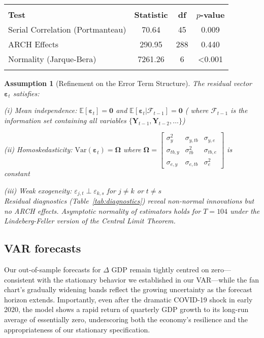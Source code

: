 \documentclass[
]{article}
\let\oldtable\table
\let\endoldtable\endtable
\renewenvironment{table}[1][H]{\oldtable[H]}{\endoldtable}
\newtheorem{assumption}{Assumption} %
\begin{document}
\begin{table}[!htbp]
\centering
\caption{\textsc{Residual Diagnostic Tests}}
\label{tab:diagnostics}
\small
\begin{tabular}{@{}lSSS@{}}
\\  \hline \hline \\
\textbf{Test} & \textbf{Statistic} & \textbf{df} & \textbf{$p$-value} \\ 
\midrule
Serial Correlation (Portmanteau) & 70.64 & 45 & 0.009 \\
ARCH Effects & 290.95 & 288 & 0.440 \\
Normality (Jarque-Bera) & 7261.26 & 6 & <0.001 \\
 \hline \hline  \\
\end{tabular}
\end{table}

\begin{assumption}[Refinement on the Error Term Structure]\label{assump:errors}
The residual vector $\bm{\varepsilon}_t$ satisfies: 

(i) Mean independence: $\mathbb{E}[\bm{\varepsilon}_t] = 
\bm{0}$ and $\mathbb{E}[\bm{\varepsilon}_t|\mathcal{F}_{t-1}] = \bm{0}$ ( where 
$\mathcal{F}_{t-1}$ is the information set containing all variables $\{\bm{Y}_{t-1}, \bm{Y}_{t-2}, \dots\}$)

(ii) Homoskedasticity: $\text{Var}(\bm{\varepsilon}_t) = \bm{\Omega}$ where 
$\bm{\Omega} = \begin{bmatrix}
\sigma^2_y & \sigma_{y,tb} & \sigma_{y,e} \\
\sigma_{tb,y} & \sigma^2_{tb} & \sigma_{tb,e} \\
\sigma_{e,y} & \sigma_{e,tb} & \sigma^2_e
\end{bmatrix}$ is constant 

(iii) Weak exogeneity: $\varepsilon_{j,t} \perp \varepsilon_{k,s}$ for $j \neq k$ or $t \neq s$ \\
Residual diagnostics (Table~\ref{tab:diagnostics}) reveal non-normal innovations but no ARCH effects.
Asymptotic normality of estimators holds for $T=104$ under the Lindeberg-Feller version of the Central Limit Theorem.
\end{assumption}


\subsection{VAR forecasts}

Our out-of-sample forecasts for $\Delta$ GDP remain tightly centred on zero—consistent 
with the stationary behavior we established in our VAR—while the fan chart’s 
gradually widening bands reflect the growing uncertainty as the forecast 
horizon extends. Importantly, even after the dramatic COVID-19 shock in early 
2020, the model shows a rapid return of quarterly GDP growth to its long-run 
average of essentially zero, underscoring both the economy’s resilience and 
the appropriateness of our stationary specification.
\end{document}
